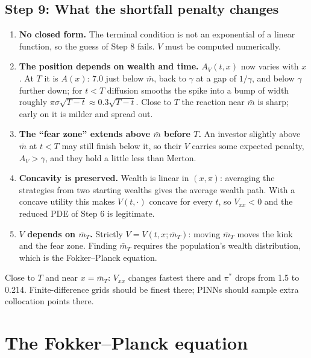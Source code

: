 \documentclass[11pt]{article}
\newcommand{\mb}{\bar m}
\begin{document}
\subsection*{Step 9: What the shortfall penalty changes}
\begin{enumerate}[label=(\alph*)]
  \item \textbf{No closed form.} The terminal condition is not an exponential of a linear
        function, so the guess of Step 8 fails. $V$ must be computed numerically.
  \item \textbf{The position depends on wealth and time.} $A_V(t,x)$ now varies with $x$.
        At $T$ it is $A(x)$: 7.0 just below $\mb$, back to $\gamma$ at a gap of
        $1/\gamma$, and below $\gamma$ further down; for $t<T$ diffusion smooths the spike
        into a bump of width roughly $\pi\sigma\sqrt{T-t}\approx0.3\sqrt{T-t}$. Close to $T$
        the reaction near $\mb$ is sharp; early on it is milder and spread out.
  \item \textbf{The ``fear zone'' extends above $\mb$ before $T$.} An investor slightly above
        $\mb$ at $t<T$ may still finish below it, so their $V$ carries some expected penalty,
        $A_V>\gamma$, and they hold a little less than Merton.
  \item \textbf{Concavity is preserved.} Wealth is linear in $(x,\pi)$: averaging the
        strategies from two starting wealths gives the average wealth path. With a concave
        utility this makes $V(t,\cdot)$ concave for every $t$, so $V_{xx}<0$ and the reduced
        PDE of Step 6 is legitimate.
  \item \textbf{$V$ depends on $\mb_T$.} Strictly $V=V(t,x;\mb_T)$: moving $\mb_T$ moves the
        kink and the fear zone. Finding $\mb_T$ requires the population's wealth distribution,
        which is the Fokker--Planck equation.
\end{enumerate}

\begin{keyidea}
Close to $T$ and near $x=\mb_T$: $V_{xx}$ changes fastest there and $\pi^*$ drops from 1.5 to
0.214. Finite-difference grids should be finest there; PINNs should sample extra collocation
points there.
\end{keyidea}

\section{The Fokker--Planck equation}
\end{document}
